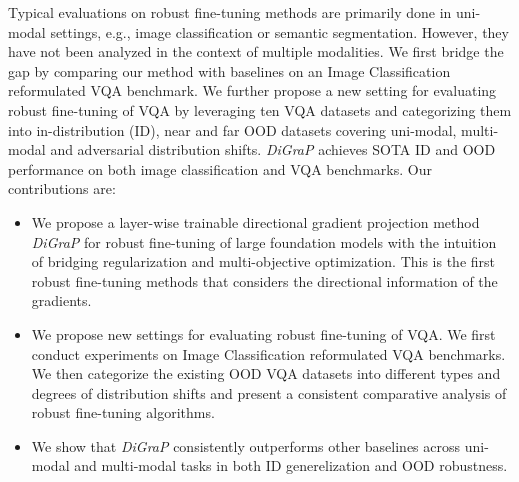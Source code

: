 Typical evaluations on robust fine-tuning methods are primarily done in uni-modal settings, e.g., image classification or semantic segmentation.  However, they have not been analyzed in the context of multiple modalities. We first bridge the gap by comparing our method with baselines on an Image Classification reformulated VQA benchmark. We further propose a new setting for evaluating robust fine-tuning of VQA by leveraging ten VQA datasets and categorizing them into in-distribution (ID), near and far OOD datasets covering uni-modal, multi-modal and adversarial distribution shifts. \emph{DiGraP} achieves SOTA ID and OOD performance on both image classification and VQA benchmarks. Our contributions are:
\begin{itemize}
    \item We propose a layer-wise trainable directional gradient projection method \emph{DiGraP} for robust fine-tuning of large foundation models with the intuition of bridging regularization and multi-objective optimization. This is the first robust fine-tuning methods that considers the directional information of the gradients.
    \item We propose new settings for evaluating robust fine-tuning of VQA. We first conduct experiments on Image Classification reformulated VQA benchmarks. We then categorize the existing OOD VQA datasets into different types and degrees of distribution shifts and present a consistent comparative analysis of robust fine-tuning algorithms.
    \item We show that \emph{DiGraP} consistently outperforms other baselines across uni-modal and multi-modal tasks in both ID generelization and OOD robustness.
\end{itemize}




